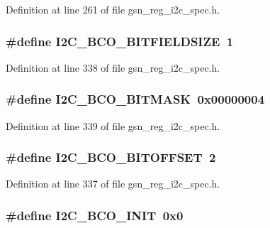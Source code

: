 Definition at line 261 of file gsn\_\-reg\_\-i2c\_\-spec.h.

\hypertarget{a00558_a28ed47f7496b12cc10f64a1077732ab0}{
\subsubsection[{I2C\_\-BCO\_\-BITFIELDSIZE}]{\setlength{\rightskip}{0pt plus 5cm}\#define I2C\_\-BCO\_\-BITFIELDSIZE~1}}
\label{a00558_a28ed47f7496b12cc10f64a1077732ab0}


Definition at line 338 of file gsn\_\-reg\_\-i2c\_\-spec.h.

\hypertarget{a00558_a1c9cd4a20ad45146bf755c2ff23c0932}{
\subsubsection[{I2C\_\-BCO\_\-BITMASK}]{\setlength{\rightskip}{0pt plus 5cm}\#define I2C\_\-BCO\_\-BITMASK~0x00000004}}
\label{a00558_a1c9cd4a20ad45146bf755c2ff23c0932}


Definition at line 339 of file gsn\_\-reg\_\-i2c\_\-spec.h.

\hypertarget{a00558_a23c3d41334b19dd969a55e5d36249ae3}{
\subsubsection[{I2C\_\-BCO\_\-BITOFFSET}]{\setlength{\rightskip}{0pt plus 5cm}\#define I2C\_\-BCO\_\-BITOFFSET~2}}
\label{a00558_a23c3d41334b19dd969a55e5d36249ae3}


Definition at line 337 of file gsn\_\-reg\_\-i2c\_\-spec.h.

\hypertarget{a00558_a8e787068429f40f48510ded243374798}{
\subsubsection[{I2C\_\-BCO\_\-INIT}]{\setlength{\rightskip}{0pt plus 5cm}\#define I2C\_\-BCO\_\-INIT~0x0}}
\label{a00558_a8e787068429f40f48510ded243374798}


